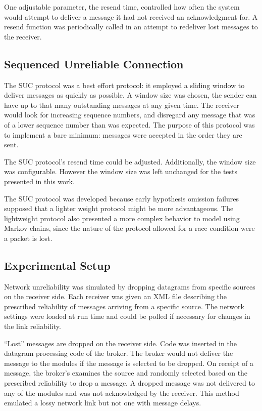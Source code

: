 One adjustable parameter, the resend time, controlled how often the system would attempt to deliver a message it had not received an acknowledgment for.
A resend function was periodically called in an attempt to redeliver lost messages to the receiver.

\subsection{Sequenced Unreliable Connection}
The SUC protocol was a best effort protocol: it employed a sliding window to deliver messages as quickly as possible.
A window size was chosen, the sender can have up to that many outstanding messages at any given time.
The receiver would look for increasing sequence numbers, and disregard any message that was of a lower sequence number than was expected.
The purpose of this protocol was to implement a bare minimum: messages were accepted in the order they are sent.

The SUC protocol's resend time could be adjusted. 
Additionally, the window size was configurable. 
However the window size was left unchanged for the tests presented in this work.

The SUC protocol was developed because early hypothesis omission failures supposed that a lighter weight protocol might be more advantageous.
The lightweight protocol also presented a more complex behavior to model using Markov chains, since the nature of the protocol allowed for a race condition were a packet is lost.

\subsection{Experimental Setup}
Network unreliability was simulated by dropping datagrams from specific sources on the receiver side.
Each receiver was given an XML file describing the prescribed reliability of messages arriving from a specific source.
The network settings were loaded at run time and could be polled if necessary for changes in the link reliability.

``Lost'' messages are dropped on the receiver side. 
Code was inserted in the datagram processing code of the broker.
The broker would not deliver the message to the modules if the message is selected to be dropped.
On receipt of a message, the broker's examines the source and randomly selected based on the prescribed reliability to drop a message.
A dropped message was not delivered to any of the modules and was not acknowledged by the receiver.
This method emulated a lossy network link but not one with message delays.

